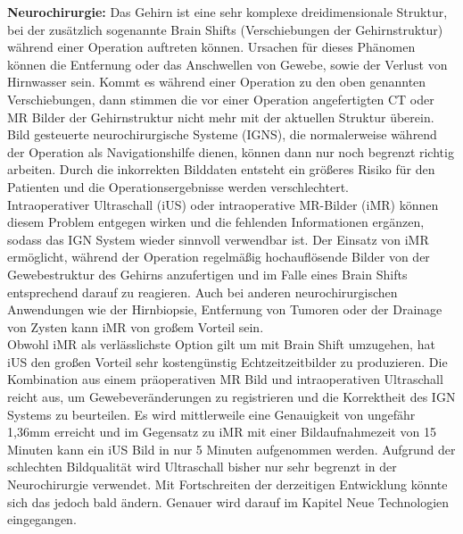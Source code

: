 \textbf{Neurochirurgie:}
Das Gehirn ist eine sehr komplexe dreidimensionale Struktur, bei der zusätzlich sogenannte Brain Shifts (Verschiebungen der Gehirnstruktur) während einer Operation auftreten können. Ursachen für dieses Phänomen können die Entfernung oder das Anschwellen von Gewebe, sowie der Verlust von Hirnwasser sein. 
Kommt es während einer Operation zu den oben genannten Verschiebungen, dann stimmen die vor einer Operation angefertigten CT oder MR Bilder der Gehirnstruktur nicht mehr mit der aktuellen Struktur überein. Bild gesteuerte neurochirurgische Systeme (IGNS), die normalerweise während der Operation als Navigationshilfe dienen, können dann nur noch begrenzt richtig arbeiten. Durch die inkorrekten Bilddaten entsteht ein größeres Risiko für den Patienten und die Operationsergebnisse werden verschlechtert.\\
Intraoperativer Ultraschall (iUS) oder intraoperative MR-Bilder (iMR) können diesem Problem entgegen wirken und die fehlenden Informationen ergänzen, sodass das IGN System wieder sinnvoll verwendbar ist.
Der Einsatz von iMR ermöglicht, während der Operation regelmäßig hochauflösende Bilder von der Gewebestruktur des Gehirns anzufertigen und im Falle eines Brain Shifts entsprechend darauf zu reagieren. Auch bei anderen neurochirurgischen Anwendungen wie der Hirnbiopsie, Entfernung von Tumoren oder der Drainage von Zysten kann iMR von großem Vorteil sein.\\
Obwohl iMR als verlässlichste Option gilt um mit Brain Shift umzugehen, hat iUS den großen Vorteil sehr kostengünstig Echtzeitzeitbilder zu produzieren. Die Kombination aus einem präoperativen MR Bild und intraoperativen Ultraschall reicht aus, um Gewebeveränderungen zu registrieren und die Korrektheit des IGN Systems zu beurteilen. Es wird mittlerweile eine Genauigkeit von ungefähr 1,36mm erreicht und im Gegensatz zu iMR mit einer Bildaufnahmezeit von 15 Minuten kann ein iUS Bild in nur 5 Minuten aufgenommen werden.
Aufgrund der schlechten Bildqualität wird Ultraschall bisher nur sehr begrenzt in der Neurochirurgie verwendet. Mit Fortschreiten der derzeitigen Entwicklung könnte sich das jedoch bald ändern. Genauer wird darauf im Kapitel \glqq Neue Technologien\grqq{}  eingegangen. \cite{BrainShiftInTumorResection}

